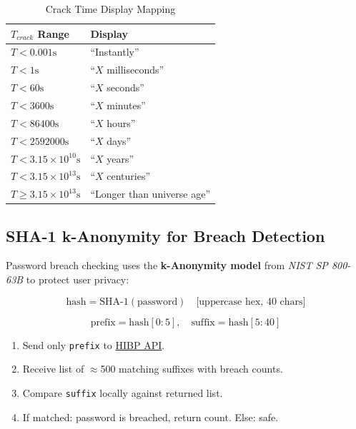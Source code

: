 \documentclass[12pt,a4paper]{article}
\begin{document}
\begin{table}[H]
\centering
\begin{tabular}{ll}
\toprule
\textbf{$T_{crack}$ Range} & \textbf{Display} \\
\midrule
$T < 0.001\text{s}$ & ``Instantly'' \\
$T < 1\text{s}$     & ``$X$ milliseconds'' \\
$T < 60\text{s}$    & ``$X$ seconds'' \\
$T < 3600\text{s}$  & ``$X$ minutes'' \\
$T < 86400\text{s}$ & ``$X$ hours'' \\
$T < 2592000\text{s}$ & ``$X$ days'' \\
$T < 3.15 \times 10^{10}\text{s}$ & ``$X$ years'' \\
$T < 3.15 \times 10^{13}\text{s}$ & ``$X$ centuries'' \\
$T \geq 3.15 \times 10^{13}\text{s}$ & ``Longer than universe age'' \\
\bottomrule
\end{tabular}
\caption{Crack Time Display Mapping}
\end{table}

\subsection{SHA-1 k-Anonymity for Breach Detection}

Password breach checking uses the \textbf{k-Anonymity model} from
\textit{NIST SP 800-63B} to protect user privacy:

\begin{equation}
\text{hash} = \text{SHA-1}(\text{password})
              \quad \text{[uppercase hex, 40 chars]}
\label{eq:sha1}
\end{equation}

\begin{equation}
\text{prefix} = \text{hash}[0:5], \quad
\text{suffix} = \text{hash}[5:40]
\label{eq:prefix}
\end{equation}

\begin{enumerate}
    \item Send only \texttt{prefix} to
          \href{https://api.pwnedpasswords.com/range/\{prefix\}}{HIBP API}.
    \item Receive list of $\approx$500 matching suffixes with breach counts.
    \item Compare \texttt{suffix} locally against returned list.
    \item If matched: password is breached, return count. Else: safe.
\end{enumerate}
\end{document}
